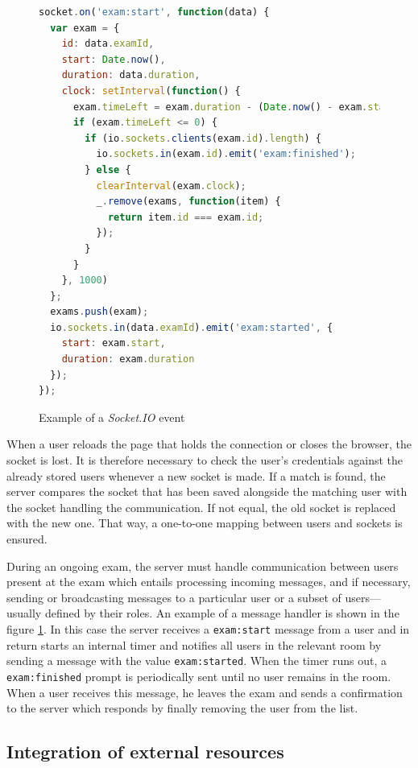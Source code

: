 \documentclass[thesis=M,english,hidelinks]{FITthesis}[2012/10/20]
\newcommand{\code}{\texttt}
\begin{document}
\begin{figure}[h]
  \begin{lstlisting}[language=JavaScript]
socket.on('exam:start', function(data) {
  var exam = {
    id: data.examId,
    start: Date.now(),
    duration: data.duration,
    clock: setInterval(function() {
      exam.timeLeft = exam.duration - (Date.now() - exam.start);
      if (exam.timeLeft <= 0) {
        if (io.sockets.clients(exam.id).length) {
          io.sockets.in(exam.id).emit('exam:finished');
        } else {
          clearInterval(exam.clock);
          _.remove(exams, function(item) {
            return item.id === exam.id;
          });
        }
      }
    }, 1000)
  };
  exams.push(exam);
  io.sockets.in(data.examId).emit('exam:started', {
    start: exam.start,
    duration: exam.duration
  });
});
  \end{lstlisting}
  \caption{Example of a \textit{Socket.IO} event}
  \label{fig:socketio_event}
\end{figure}

When a user reloads the page that holds the connection or closes the browser, the socket is lost. It is therefore necessary to check the user's credentials against the already stored users whenever a new socket is made. If a match is found, the server compares the socket that has been saved alongside the matching user with the socket handling the communication. If not equal, the old socket is replaced with the new one. That way, a one-to-one mapping between users and sockets is ensured.

During an ongoing exam, the server must handle communication between users present at the exam which entails processing incoming messages, and if necessary, sending or broadcasting messages to a particular user or a subset of users---usually defined by their roles. An example of a message handler is shown in the figure \ref{fig:socketio_event}. In this case the server receives a \code{exam:start} message from a user and in return starts an internal timer and notifies all users in the relevant room by sending a message with the value \code{exam:started}. When the timer runs out, a \code{exam:finished} prompt is periodically sent until no user remains in the room. When a user receives this message, he leaves the exam and sends a confirmation to the server which responds by finally removing the user from the list.

    \subsection{Integration of external resources}
\end{document}
